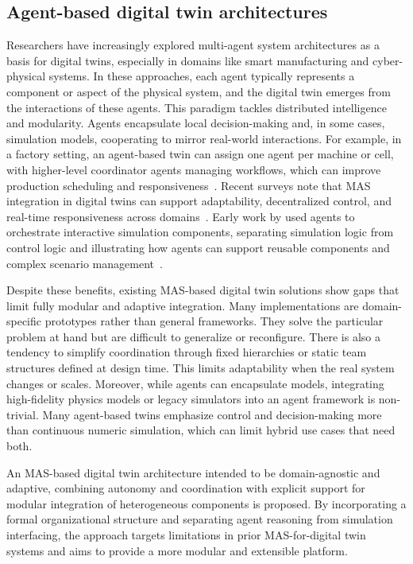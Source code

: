 \subsection{Agent-based digital twin architectures}
Researchers have increasingly explored multi-agent system architectures as a basis for digital twins, especially in domains like smart manufacturing and cyber-physical systems. In these approaches, each agent typically represents a component or aspect of the physical system, and the digital twin emerges from the interactions of these agents. This paradigm tackles distributed intelligence and modularity. Agents encapsulate local decision-making and, in some cases, simulation models, cooperating to mirror real-world interactions. For example, in a factory setting, an agent-based twin can assign one agent per machine or cell, with higher-level coordinator agents managing workflows, which can improve production scheduling and responsiveness~\cite{latsou2021dt_mas_cpms}. Recent surveys note that MAS integration in digital twins can support adaptability, decentralized control, and real-time responsiveness across domains~\cite{Kalyani2024Survey}. Early work by \citeauthor{zhao2004agent} used agents to orchestrate interactive simulation components, separating simulation logic from control logic and illustrating how agents can support reusable components and complex scenario management~\cite{zhao2004agent}.

Despite these benefits, existing MAS-based digital twin solutions show gaps that limit fully modular and adaptive integration. Many implementations are domain-specific prototypes rather than general frameworks. They solve the particular problem at hand but are difficult to generalize or reconfigure. There is also a tendency to simplify coordination through fixed hierarchies or static team structures defined at design time. This limits adaptability when the real system changes or scales. Moreover, while agents can encapsulate models, integrating high-fidelity physics models or legacy simulators into an agent framework is non-trivial. Many agent-based twins emphasize control and decision-making more than continuous numeric simulation, which can limit hybrid use cases that need both.

An MAS-based digital twin architecture intended to be domain-agnostic and adaptive, combining autonomy and coordination with explicit support for modular integration of heterogeneous components is proposed. By incorporating a formal organizational structure and separating agent reasoning from simulation interfacing, the approach targets limitations in prior MAS-for-digital twin systems and aims to provide a more modular and extensible platform.

